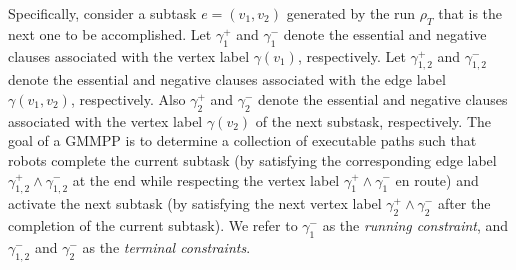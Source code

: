 \documentclass[journal]{IEEEtran}
\begin{document}
{Specifically, consider a subtask $e = (v_1, v_2)$ generated by the run $\rho_T$ that is the next one to be accomplished. 
Let $\gamma_1^+$ and $\gamma_1^-$ denote the essential and negative clauses associated with the vertex label $\gamma(v_1)$, respectively. Let $\gamma_{1,2}^{+}$ and $\gamma_{1,2}^{-}$  denote the essential and negative clauses  associated with the edge label $\gamma(v_1, v_2)$, respectively. Also $\gamma_2^+$ and $\gamma_2^-$ denote the essential and negative clauses associated with the vertex label $\gamma(v_2)$ of the next substask, respectively. The goal of a GMMPP is to determine a collection of executable paths such that robots complete the current subtask (by satisfying the corresponding edge label $\gamma_{1,2}^+ \wedge \gamma_{1,2}^-$ at the end while respecting the vertex label $\gamma_1^+ \wedge \gamma_1^-$ en route) and activate the next subtask (by satisfying the next vertex label $\gamma_2^{+}\wedge \gamma_2^{-}$ after the completion of the current subtask). We refer to $\gamma_1^-$ as the {\it running constraint}, and $\gamma_{1,2}^- $ and $ \gamma_2^{-}$ as the {\it terminal constraints}.


}
\end{document}
